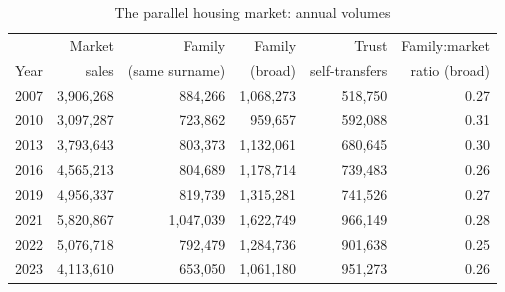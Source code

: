 \begin{table}[!t]\centering
\caption{The parallel housing market: annual volumes}
\label{tab:volumes}
{\small
\begin{tabular}{lrrrrr}
\toprule
 & Market & Family & Family & Trust & Family:market \\
Year & sales & (same surname) & (broad) & self-transfers & ratio (broad) \\
\midrule
2007 & 3,906,268 & 884,266 & 1,068,273 & 518,750 & 0.27 \\
2010 & 3,097,287 & 723,862 & 959,657 & 592,088 & 0.31 \\
2013 & 3,793,643 & 803,373 & 1,132,061 & 680,645 & 0.30 \\
2016 & 4,565,213 & 804,689 & 1,178,714 & 739,483 & 0.26 \\
2019 & 4,956,337 & 819,739 & 1,315,281 & 741,526 & 0.27 \\
2021 & 5,820,867 & 1,047,039 & 1,622,749 & 966,149 & 0.28 \\
2022 & 5,076,718 & 792,479 & 1,284,736 & 901,638 & 0.25 \\
2023 & 4,113,610 & 653,050 & 1,061,180 & 951,273 & 0.26 \\
\bottomrule
\end{tabular}}
\begin{minipage}{0.9\textwidth}\end{minipage}
\end{table}
